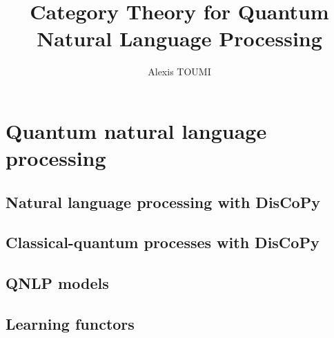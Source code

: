 

\title{Category Theory for Quantum\\Natural Language Processing}
\author{Alexis TOUMI}  
\degreedate{\today}




\begin{romanpages} \maketitle

\tableofcontents
\end{romanpages}




















\chapter{Quantum natural language processing} \label{chapter-2:qnlp}

\section{Natural language processing with DisCoPy}\label{section:NLP}
\section{Classical-quantum processes with DisCoPy}
\section{QNLP models}
\section{Learning functors}

